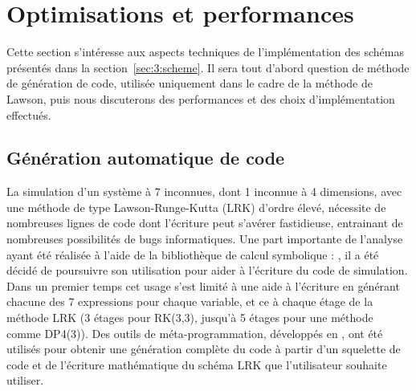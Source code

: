 
\section{Optimisations et performances}
\label{s:3:info}

Cette section s'intéresse aux aspects techniques de l'implémentation des schémas présentés dans la section~\ref{sec:3:scheme}. Il sera tout d'abord question de méthode de génération de code, utilisée uniquement dans le cadre de la méthode de Lawson, puis nous discuterons des performances et des choix d'implémentation effectués.

\subsection{Génération automatique de code}
\label{ssec:3:codegen}

La simulation d'un système à 7 inconnues, dont 1 inconnue à 4 dimensions, avec une méthode de type Lawson-Runge-Kutta (LRK) d'ordre élevé, nécessite de nombreuses lignes de code dont l'écriture peut s'avérer fastidieuse, entrainant de nombreuses possibilités de bugs informatiques. Une part importante de l'analyse ayant été réalisée à l'aide de la bibliothèque de calcul symbolique \Python{} : \sympy, il a été décidé de poursuivre son utilisation pour aider à l'écriture du code de simulation. Dans un premier temps cet usage s'est limité à une aide à l'écriture en générant chacune des 7 expressions pour chaque variable, et ce à chaque étage de la méthode LRK (3 étages pour RK(3,3), jusqu'à 5 étages pour une méthode comme DP4(3)). Des outils de méta-programmation, développés en \Python{}, ont été utilisés pour obtenir une génération complète du code à partir d'un squelette de code \CC{} et de l'écriture mathématique du schéma LRK que l'utilisateur souhaite utiliser.

